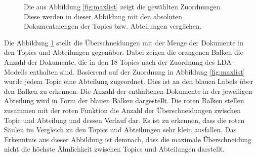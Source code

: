 \documentclass[german,version-2020-11]{uzl-thesis}
\begin{document}
\begin{figure}[H]
\begin{center}

\end{center}
\caption{Die aus Abbildung \ref{fig:maxlist} zeigt die gewählten Zuordnungen. Diese werden in dieser Abbildung mit den absoluten Dokumentmengen der Topics bzw. Abteilungen verglichen.}
\label{fig:comp}
\end{figure}

Die Abbildung \ref{fig:comp} stellt die Überschneidungen mit der Menge der Dokumente in den Topics und Abteilungen gegenüber. Dabei zeigen die orangenen Balken die Anzahl der Dokumente, die in den 18 Topics nach der Zuordnung des LDA-Modells enthalten sind. Basierend auf der Zuordnung in Abbildung \ref{fig:maxlist} wurde jedem Topic eine Abteilung zugeordnet. Dies ist an den blauen Labels über den Balken zu erkennen. Die Anzahl der enthaltenen Dokumente in der jeweiligen Abteilung wird in Form der blauen Balken dargestellt. Die roten Balken stellen zusammen mit der roten Funktion die Anzahl der Überschneidungen zwischen Topic und Abteilung und dessen Verlauf dar. Es ist zu erkennen, dass die roten Säulen im Vergleich zu den Topics und Abteilungen sehr klein ausfallen. Das Erkenntnis aus dieser Abbildung ist demnach, dass die maximale Überschneidung nicht die höchste Ähnlichkeit zwischen Topics und Abteilungen darstellt. \\
\end{document}
